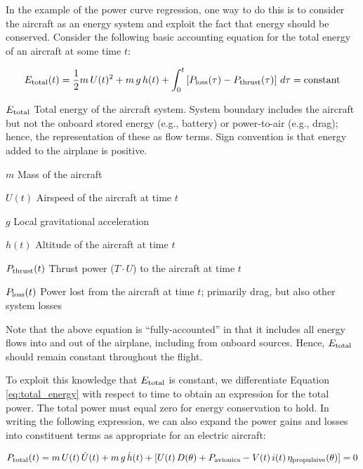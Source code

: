 In the example of the power curve regression, one way to do this is to consider the aircraft as an energy system and exploit the fact that energy should be conserved. Consider the following basic accounting equation for the total energy of an aircraft at some time $t$:

\begin{equation}
    E_{\rm total}(t) =
    \frac{1}{2}m \, U(t)^2
    + m \, g \, h(t)
    + \int_0^t \left[
        P_{\rm loss}(\tau)
        - P_{\rm thrust}(\tau)
        \right] \, d\tau = \text{constant}
    \label{eq:total_energy}
\end{equation}

\begin{eqexpl}
    \item{$E_{\rm total}$} Total energy of the aircraft system. System boundary includes the aircraft but not the onboard stored energy (e.g., battery) or power-to-air (e.g., drag); hence, the representation of these as flow terms. Sign convention is that energy added to the airplane is positive.
    \item{$m$} Mass of the aircraft
    \item{$U(t)$} Airspeed of the aircraft at time $t$
    \item{$g$} Local gravitational acceleration
    \item{$h(t)$} Altitude of the aircraft at time $t$
    \item{$P_{\rm thrust}(t)$} Thrust power ($T \cdot U$) to the aircraft at time $t$
    \item{$P_{\rm loss}(t)$} Power lost from the aircraft at time $t$; primarily drag, but also other system losses
\end{eqexpl}

\noindent Note that the above equation is ``fully-accounted'' in that it includes all energy flows into and out of the airplane, including from onboard sources. Hence, $E_{\rm total}$ should remain constant throughout the flight.

To exploit this knowledge that $E_{\rm total}$ is constant, we differentiate Equation \ref{eq:total_energy} with respect to time to obtain an expression for the total power. The total power must equal zero for energy conservation to hold. In writing the following expression, we can also expand the power gains and losses into constituent terms as appropriate for an electric aircraft:

\begin{equation}
    P_{\rm total}(t) =
    m \, U(t) \, \dot{U}(t)
    + m \, g \, \dot{h}(t)
    + \left[
        U(t) \, D(\theta)
        + P_{\rm avionics}
        - V(t) \, i(t) \, \eta_{\rm propulsive}(\theta)
        \right] = 0
    \label{eq:total_power}
\end{equation}

